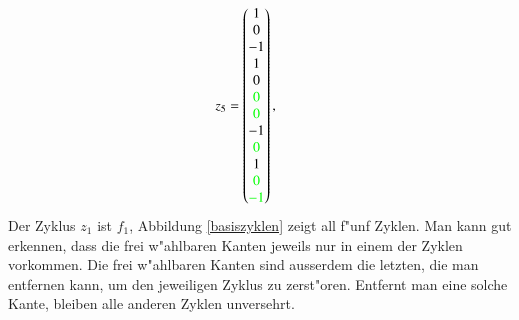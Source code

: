 \[z_5=\begin{pmatrix}  1\\ 0\\-1\\ 1\\ 0\\\color{green} 0\\\color{green} 0\\-1\\\color{green} 0\\ 1\\\color{green} 0\\\color{green}-1\end{pmatrix},\qquad
\]
Der Zyklus $z_1$ ist $f_1$, Abbildung \ref{basiszyklen} zeigt all
f"unf Zyklen. Man kann gut erkennen, dass die frei w"ahlbaren Kanten
jeweils nur in einem der Zyklen vorkommen. Die frei w"ahlbaren Kanten
sind ausserdem die letzten, die man entfernen kann, um den jeweiligen
Zyklus zu zerst"oren. Entfernt man eine solche Kante, bleiben alle
anderen Zyklen unversehrt.

